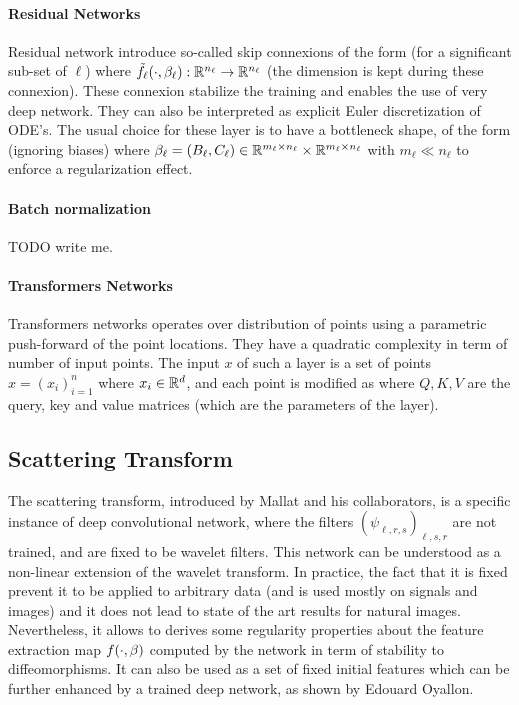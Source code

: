 \paragraph{Residual Networks}

Residual network introduce so-called skip connexions of the form (for a significant sub-set of $\ell$)
where $\tilde f_\ell(\cdot,\beta_\ell) : \mathbb{R}^{n_\ell} \rightarrow \mathbb{R}^{n_\ell}$ (the dimension is kept during these connexion). These connexion stabilize the training and enables the use of very deep network. They can also be interpreted as explicit Euler discretization of ODE's.
%
The usual choice for these layer is to have a bottleneck shape, of the form 
(ignoring biases) where $\beta_\ell = (B_\ell, C_\ell) \in \mathbb{R}^{m_\ell \times n_\ell} \times \mathbb{R}^{m_\ell \times n_\ell}$ with $m_\ell \ll n_\ell$ to enforce a regularization effect. 


\paragraph{Batch normalization}

TODO write me.

\paragraph{Transformers Networks}

Transformers networks operates over distribution of points using a parametric push-forward of the point locations. They have a quadratic complexity in term of number of input points. 
%
The input $x$ of such a layer is a set of points $x = (x_i)_{i=1}^n$ where $x_i \in \mathbb{R}^d$, and each point is modified as 
where $Q,K,V$ are the query, key and value matrices (which are the parameters of the layer). 

\subsection{Scattering Transform}
\label{sec-scattering}

The scattering transform, introduced by Mallat and his collaborators, is a specific instance of deep convolutional network, where the filters $ (\psi_{\ell,r,s})_{\ell,s,r}$ are not trained, and are fixed to be wavelet filters. This network can be understood as a non-linear extension of the wavelet transform. In practice, the fact that it is fixed prevent it to be applied to arbitrary data (and is used mostly on signals and images) and it does not lead to state of the art results for natural images. Nevertheless, it allows to derives some regularity properties about the feature extraction map $f(\cdot,\beta)$ computed by the network in term of stability to diffeomorphisms. It can also be used as a set of fixed initial features which can be further enhanced by a trained deep network, as shown by Edouard Oyallon.  

